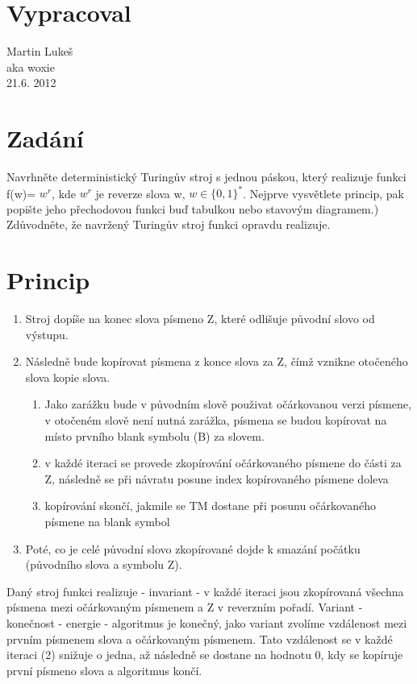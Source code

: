 \documentclass{article}
\begin{document}
\section{Vypracoval}
Martin Lukeš \\
aka woxie\\
21.6. 2012

\section{Zadání}
Navrhněte deterministický Turingův stroj s jednou páskou, který realizuje
funkci f(w)= $w^r$, kde $w^r$ je reverze slova w, $w \in \{0,1\}^*$. Nejprve
vysvětlete princip, pak popište jeho přechodovou funkci buď tabulkou nebo
stavovým diagramem.) Zdůvodněte, že navržený Turingův stroj funkci opravdu
realizuje.

\section{Princip}
\begin{enumerate}
  \item  Stroj dopíše na konec slova písmeno Z, které odlišuje původní slovo od
výstupu.
  \item  Následně bude kopírovat písmena z konce slova za Z, čímž vznikne
otočeného slova kopie slova. 
	\begin{enumerate}
		\item Jako zarážku bude v původním slově použivat
očárkovanou verzi písmene, v otočeném slově není nutná zarážka, písmena se budou
kopírovat na místo prvního blank symbolu (B) za slovem.
		\item v každé iteraci se provede zkopírování očárkovaného písmene do části za
		Z, následně se při návratu posune index kopírovaného písmene doleva
		\item kopírování skončí, jakmile se TM dostane při posunu očárkovaného písmene
		na blank symbol		
	\end{enumerate}
\item  Poté, co je celé původní slovo zkopírované dojde k smazání počátku (původního
 slova a symbolu Z).
\end{enumerate}

Daný stroj funkci realizuje - invariant - v každé iteraci jsou zkopírovaná
všechna písmena mezi očárkovaným písmenem a Z v reverzním pořadí. Variant -
konečnost - energie - algoritmus je konečný, jako variant zvolíme vzdálenost
mezi prvním písmenem slova a očárkovaným písmenem. Tato vzdálenost se v každé
iteraci (2) snižuje o jedna, až následně se dostane na hodnotu 0, kdy se
kopíruje první písmeno slova a algoritmus končí.
\end{document}
